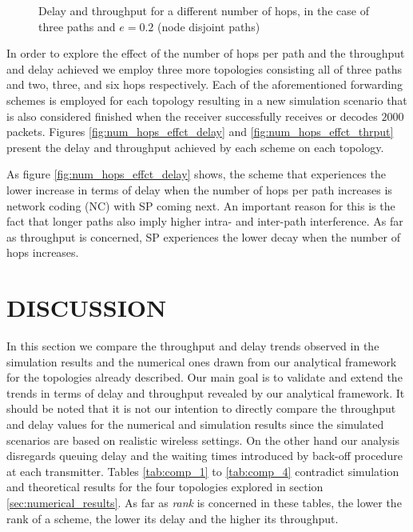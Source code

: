 \documentclass[journal, onecolumn, 12pt]{IEEEtran}
\begin{document}
\begin{figure}[ht]
\centering
{}
\label{fig:num_of_hops_eff}
\caption{Delay and throughput for a different number of hops, in the case of three paths and $e=0.2$ (node disjoint paths)}
\end{figure}

In order to explore the effect of the number of hops per path and the throughput and delay achieved we employ three more topologies consisting all of three paths and two, three, and six hops respectively.
Each of the aforementioned forwarding schemes is employed for each topology resulting in a new simulation scenario that is also considered finished when the receiver successfully receives or decodes $2000$ packets.
Figures \ref{fig:num_hops_effct_delay} and \ref{fig:num_hops_effct_thrput} present the delay and throughput achieved by each scheme on each topology.

As figure \ref{fig:num_hops_effct_delay} shows, the scheme that experiences the lower increase in terms of delay when the number of hops per path increases is network
coding (NC) with SP coming next.
An important reason for this is the fact that longer paths also imply higher intra- and inter-path interference.
As far as throughput is concerned, SP experiences the lower decay when the number of hops increases.

\section{\uppercase{Discussion}}
\label{sec:discussion}

In this section we compare the throughput and delay trends observed in the simulation results and the numerical ones drawn from our analytical framework for the topologies already described.
Our main goal is to validate and extend the trends in terms of delay and throughput revealed by our analytical framework.
It should be noted that it is not our intention to directly compare the throughput and delay values for the numerical and simulation results since the simulated scenarios are based on realistic wireless settings.
On the other hand our analysis disregards queuing delay and the waiting times introduced by back-off procedure at each transmitter.
Tables \ref{tab:comp_1} to \ref{tab:comp_4} contradict simulation and theoretical results for the four topologies explored in section \ref{sec:numerical_results}.
As far as \textit{rank} is concerned in these tables, the lower the rank of a scheme, the lower its delay and the higher its throughput.
\end{document}
